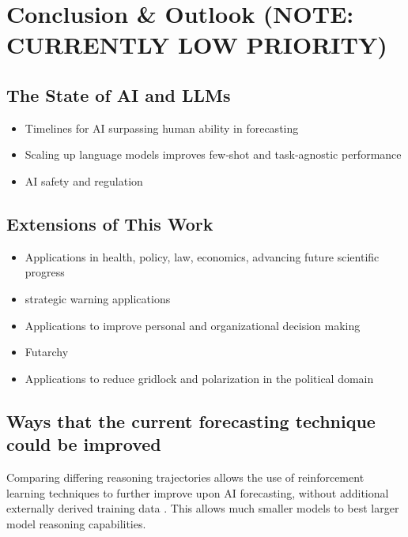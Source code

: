 \documentclass[12pt,a4paper]{article}
\begin{document}
\clearpage
\section{Conclusion \& Outlook (NOTE: CURRENTLY LOW PRIORITY)} %
\label{sec:conclusion_outlook}
\subsection{The State of AI and LLMs}
\begin{itemize}
  \item Timelines for AI surpassing human ability in forecasting 
  \item Scaling up language models improves few‑shot and task‑agnostic performance 
  \item AI safety and regulation
\end{itemize}
\subsection{Extensions of This Work}
\begin{itemize}
  \item Applications in health, policy, law, economics, advancing future scientific progress
  \item strategic warning applications 
  \item Applications to improve personal and organizational decision making
  \item Futarchy   
  \item Applications to reduce gridlock and polarization in the political domain
\end{itemize}
\subsection{Ways that the current forecasting technique could be improved}
Comparing differing reasoning trajectories allows the use of reinforcement learning techniques to further improve upon AI forecasting, without additional externally derived training data . This allows much smaller models to best larger model reasoning capabilities.
\end{document}
